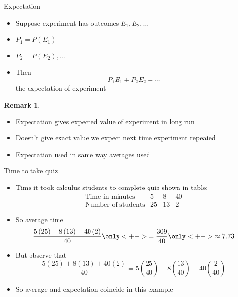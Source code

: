 \documentclass[handout]{beamer}
\theoremstyle{definition}
\newtheorem{remark}{Remark}
\begin{document}
\begin{frame}{Expectation}
\begin{definition}
\begin{itemize}
\item Suppose experiment has outcomes $E_1,E_2,\ldots$
\item $P_1=P\left(E_1\right)$
\item $P_2=P\left(E_2\right),\ldots$
\item Then
\[P_1E_1+P_2E_2+\cdots\]
the \alert{expectation} of experiment
\end{itemize}
\end{definition}
\begin{remark}
\begin{itemize}
\item Expectation gives
\alert{expected value} of experiment \alert{in long run}
\item Doesn't give exact value we expect
next time experiment repeated
\item Expectation used in same way averages used
\end{itemize}
\end{remark}
\end{frame}

\begin{frame}{Time to take quiz}
\begin{itemize}
\item Time it took calculus students to complete quiz
shown in table:
\[\begin{array}{r|ccc}
\text{Time in minutes}&5&8&40\\\hline
\text{Number of students}&25&13&2
\end{array}\]
\item So average time
\[\frac{5\left(25\right)+8\left(13\right)+40\left(2\right)}{40}
\only<+->{=\frac{309}{40}}
\only<+->{\approx 7.73}\]
\item But observe that
\[\frac{5\left(25\right)+8\left(13\right)+40\left(2\right)}{40}
=5\left(\frac{25}{40}\right)+8\left(\frac{13}{40}\right)
+40\left(\frac{2}{40}\right)\]
\item So average and expectation coincide in this example
\end{itemize}
\end{frame}
\end{document}
